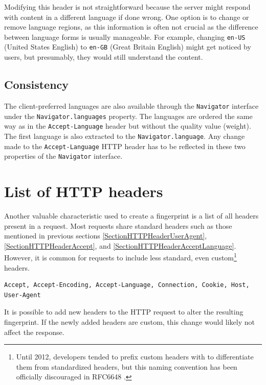 \medbreak

Modifying this header is not straightforward because the server might respond with content in a different language if done wrong. One option is to change or remove language regions, as this information is often not crucial as the difference between language forms is usually manageable. For example, changing \texttt{en-US} (United States English) to \texttt{en-GB} (Great Britain English) might get noticed by users, but presumably, they would still understand the content.

\subsection{Consistency}

The client-preferred languages are also available through the \texttt{Navigator} interface under the \texttt{Navigator.languages} property. The languages are ordered the same way as in the \texttt{Accept-Language} header but without the quality value (weight). The first language is also extracted to the \texttt{Navigator.language}. Any change made to the \texttt{Accept-Language} HTTP header has to be reflected in these two properties of the \texttt{Navigator} interface.

\section{List of HTTP headers}

Another valuable characteristic used to create a fingerprint is a list of all headers present in a request. Most requests share standard headers such as those mentioned in previous sections \ref{SectionHTTPHeaderUserAgent}, \ref{SectionHTTPHeaderAccept}, and \ref{SectionHTTPHeaderAcceptLanguage}. However, it is common for requests to include less standard, even custom\footnote{Until 2012, developers tended to prefix custom headers with  to differentiate them from standardized headers, but this naming convention has been officially discouraged in RFC6648 \cite{RFC6648}.} headers.

\bigbreak

\begin{lstlisting}[caption={An example of a list of headers present in an HTTP request.}]
Accept, Accept-Encoding, Accept-Language, Connection, Cookie, Host, User-Agent
\end{lstlisting}

\medbreak

It is possible to add new headers to the HTTP request to alter the resulting fingerprint. If the newly added headers are custom, this change would likely not affect the response.

% 